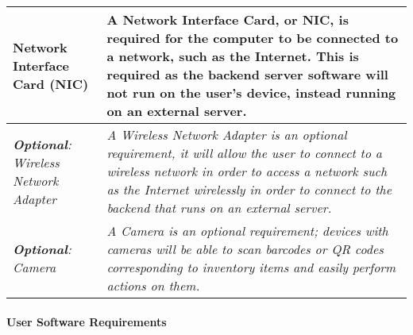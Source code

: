 \documentclass[../../../main.tex]{subfiles}
\begin{document}
\begin{tabular}{ |p{}|p{}| }
    \hline
    Network Interface Card (NIC)                         & A Network Interface Card, or NIC, is required for the computer to be connected to a network, such as the Internet. This is required as the backend server software will not run on the user's device, instead running on an external server.             \\
    \hline
    \textit{\textbf{Optional}: Wireless Network Adapter} & \textit{A Wireless Network Adapter is an optional requirement, it will allow the user to connect to a wireless network in order to access a network such as the Internet wirelessly in order to connect to the backend that runs on an external server.} \\
    \hline
    \textit{\textbf{Optional}: Camera}                   & \textit{A Camera is an optional requirement; devices with cameras will be able to scan barcodes or QR codes corresponding to inventory items and easily perform actions on them.}                                                                        \\
    \hline
\end{tabular}

\pagebreak

\paragraph{User Software Requirements\\\\}
\end{document}
